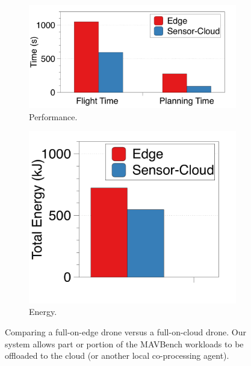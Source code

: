 \begin{figure}[b!]
\centering
    \begin{subfigure}{.608\columnwidth}
    \centering
    \includegraphics[trim=5 0 20 0, clip, width=\columnwidth]{figs/tx2-desktop_performance}
    \caption{Performance.}
    \label{Perforamnce}
    \end{subfigure}
    \hfill
    \begin{subfigure}{.365\columnwidth}
    \centering
    \includegraphics[trim=5 10 0 0, clip, width=\columnwidth]{figs/tx2-desktop_energy}
    \caption{Energy.}
    \label{fig:drone-power-time-series}
    \end{subfigure}
\caption{Comparing a full-on-edge drone versus a full-on-cloud drone. Our system allows part or portion of the MAVBench workloads to be offloaded to the cloud (or another local co-processing agent).}
\label{fig:cloud_edge}
\end{figure}

